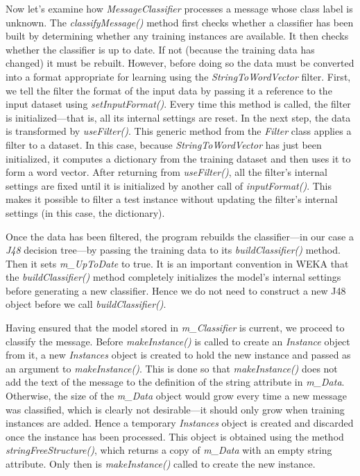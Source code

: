 Now let's examine how \textit{MessageClassifier} processes a message
whose class label is unknown. The \textit{classifyMessage()} method
first checks whether a classifier has been built by determining
whether any training instances are available. It then checks whether
the classifier is up to date. If not (because the training data has
changed) it must be rebuilt. However, before doing so the data must be
converted into a format appropriate for learning using the
\textit{StringToWordVector} filter. First, we tell the filter the
format of the input data by passing it a reference to the input
dataset using \textit{setInputFormat()}. Every time this method is
called, the filter is initialized---that is, all its internal settings
are reset. In the next step, the data is transformed by
\textit{useFilter()}. This generic method from the \textit{Filter}
class applies a filter to a dataset. In this case, because
\textit{StringToWordVector} has just been initialized, it computes a
dictionary from the training dataset and then uses it to form a word
vector. After returning from \textit{useFilter()}, all the filter's
internal settings are fixed until it is initialized by another call of
\textit{inputFormat()}. This makes it possible to filter a test
instance without updating the filter's internal settings (in this
case, the dictionary).

Once the data has been filtered, the program rebuilds the
classifier---in our case a \textit{J48} decision tree---by passing the
training data to its \textit{buildClassifier()} method. Then it sets
\textit{m\_UpToDate} to true. It is an important convention in WEKA
that the \textit{buildClassifier()} method completely initializes the
model's internal settings before generating a new classifier. Hence we
do not need to construct a new J48 object before we call
\textit{buildClassifier()}.

Having ensured that the model stored in \textit{m\_Classifier} is
current, we proceed to classify the message. Before
\textit{makeInstance()} is called to create an \textit{Instance}
object from it, a new \textit{Instances} object is created to hold the
new instance and passed as an argument to
\textit{makeInstance()}. This is done so that \textit{makeInstance()}
does not add the text of the message to the definition of the string
attribute in \textit{m\_Data}. Otherwise, the size of the
\textit{m\_Data} object would grow every time a new message was
classified, which is clearly not desirable---it should only grow when
training instances are added. Hence a temporary \textit{Instances}
object is created and discarded once the instance has been
processed. This object is obtained using the method
\textit{stringFreeStructure()}, which returns a copy of
\textit{m\_Data} with an empty string attribute. Only then is
\textit{makeInstance()} called to create the new instance.

